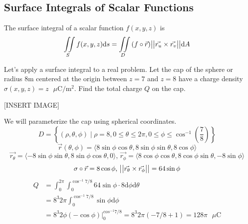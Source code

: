 \subsection{Surface Integrals of Scalar Functions}
\begin{definition}
	The surface integral of a scalar function $f(x,y,z)$ is
	\begin{equation*}
		\iint\limits_{S}{f(x,y,z)\mathrm{d}s} = \iint\limits_{D}{(f\circ\vec{r})\big\lvert \big\lvert \vec{r_u} \times \vec{r_v} \big\rvert \big\rvert\mathrm{d}A}
	\end{equation*}
\end{definition}

\noindent
Let’s apply a surface integral to a real problem. Let the cap of the sphere or radius $8\text{m}$ centered at the origin between $z = 7$ and $z = 8$ have a charge density $\sigma(x,y,z) = z \text{ } \mu \text{C}/ \text{m}^2$. Find the total charge $Q$ on the cap.

[INSERT IMAGE]

\noindent
We will parameterize the cap using spherical coordinates.
\begin{equation*}
	D = \left\{(\rho, \theta, \phi) \mid \rho=8, 0 \leq \theta \leq 2\pi, 0 \leq \phi \leq \cos^{-1}{\left(\frac{7}{8}\right)}\right\}
\end{equation*}
\begin{equation*}
	\vec{r}(\theta,\phi) = \langle 8\sin{\phi}\cos{\theta}, 8\sin{\phi}\sin{\theta}, 8\cos{\phi}\rangle
\end{equation*}
\begin{equation*}
	\vec{r_\theta} = \langle -8\sin{\phi}\sin{\theta}, 8\sin{\phi}\cos{\theta}, 0\rangle \text{, }
	\vec{r_\phi} = \langle 8\cos{\phi}\cos{\theta}, 8\cos{\phi}\sin{\theta}, -8\sin{\phi}\rangle
\end{equation*}
\begin{equation*}
	\sigma\circ\vec{r} = 8\cos{\phi} \text{, }
	\big\lvert \big\lvert \vec{r_\theta} \times \vec{r_\phi} \big\rvert \big\rvert = 64\sin{\phi}
\end{equation*}
\begin{align*}
	Q &= \int_{0}^{2\pi}{\int_{0}^{\cos^{-1}{7/8}}{64\sin{\phi} \cdot8 \mathrm{d}\phi\mathrm{d}\theta}} \\
	& = 8^3 2\pi \int_{0}^{\cos^{-1}{7/8}}{\sin{\phi}\mathrm{d}\phi} \\
	&= 8^3 2\phi(-\cos{\phi})\rvert_{0}^{cos^{-1}{7/8}} = 8^3 2\pi\left(-7/8 + 1\right) = 128\pi\text{ }\mu\text{C}
\end{align*}